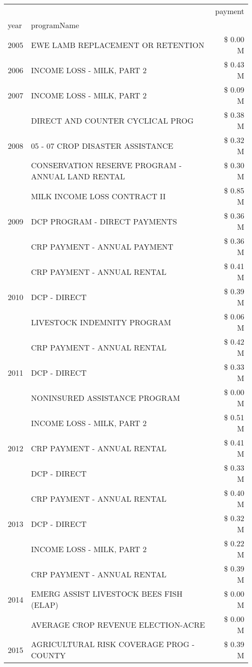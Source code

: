 \begin{tabular}{llr}
\toprule
 &  & payment \\
year & programName &  \\
\midrule
2005 & EWE LAMB REPLACEMENT OR RETENTION & \$ 0.00 M \\
\cline{1-3}
2006 & INCOME LOSS - MILK, PART 2 & \$ 0.43 M \\
\cline{1-3}
2007 & INCOME LOSS - MILK, PART 2 & \$ 0.09 M \\
\cline{1-3}
\multirow[t]{3}{*}{2008} & DIRECT AND COUNTER CYCLICAL PROG & \$ 0.38 M \\
 & 05 - 07 CROP DISASTER ASSISTANCE & \$ 0.32 M \\
 & CONSERVATION RESERVE PROGRAM - ANNUAL LAND RENTAL & \$ 0.30 M \\
\cline{1-3}
\multirow[t]{3}{*}{2009} & MILK INCOME LOSS CONTRACT II & \$ 0.85 M \\
 & DCP PROGRAM - DIRECT PAYMENTS & \$ 0.36 M \\
 & CRP PAYMENT - ANNUAL PAYMENT & \$ 0.36 M \\
\cline{1-3}
\multirow[t]{3}{*}{2010} & CRP PAYMENT - ANNUAL RENTAL & \$ 0.41 M \\
 & DCP - DIRECT & \$ 0.39 M \\
 & LIVESTOCK INDEMNITY PROGRAM & \$ 0.06 M \\
\cline{1-3}
\multirow[t]{3}{*}{2011} & CRP PAYMENT - ANNUAL RENTAL & \$ 0.42 M \\
 & DCP - DIRECT & \$ 0.33 M \\
 & NONINSURED ASSISTANCE PROGRAM & \$ 0.00 M \\
\cline{1-3}
\multirow[t]{3}{*}{2012} & INCOME LOSS - MILK, PART 2 & \$ 0.51 M \\
 & CRP PAYMENT - ANNUAL RENTAL & \$ 0.41 M \\
 & DCP - DIRECT & \$ 0.33 M \\
\cline{1-3}
\multirow[t]{3}{*}{2013} & CRP PAYMENT - ANNUAL RENTAL & \$ 0.40 M \\
 & DCP - DIRECT & \$ 0.32 M \\
 & INCOME LOSS - MILK, PART 2 & \$ 0.22 M \\
\cline{1-3}
\multirow[t]{3}{*}{2014} & CRP PAYMENT - ANNUAL RENTAL & \$ 0.39 M \\
 & EMERG ASSIST LIVESTOCK BEES FISH (ELAP) & \$ 0.00 M \\
 & AVERAGE CROP REVENUE ELECTION-ACRE & \$ 0.00 M \\
\cline{1-3}
\multirow[t]{3}{*}{2015} & AGRICULTURAL RISK COVERAGE PROG - COUNTY & \$ 0.39 M \\

\end{tabular}

